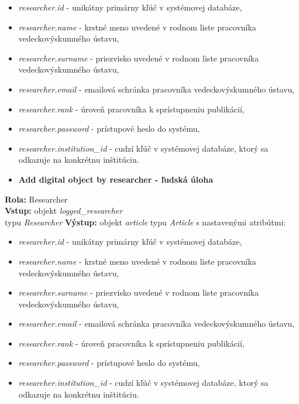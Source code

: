 \documentclass[10pt,oneside,slovak,a4paper]{article}
\begin{document}
\begin{itemize}
\item \textit{researcher.id} - unikátny primárny kľúč v systémovej databáze,
\item \textit{researcher.name} - krstné meno uvedené v rodnom liste pracovníka vedeckovýskumného ústavu,
\item \textit{researcher.surname} -  priezvisko uvedené v rodnom liste pracovníka vedeckovýskumného ústavu,
\item \textit{researcher.email} - emailová schránka pracovníka vedeckovýskumného ústavu,
\item \textit{researcher.rank} - úroveň pracovníka k sprístupneniu publikácií,
\item \textit{researcher.password} - prístupové heslo do systému,
\item \textit{researcher.institution\_id} - cudzí kľúč v systémovej databáze, ktorý sa odkazuje na konkrétnu inštitúciu.
\end{itemize}

\begin{itemize}
\item \textbf{Add digital object by researcher - ľudská úloha}
\end{itemize}

\textbf{Rola:} Researcher\\
\textbf{Vstup:} objekt \textit{logged\_researcher}\\ typu \textit{Researcher}
\textbf{Výstup:} objekt \textit{article} typu \textit{Article} s nastavenými atribútmi:

\begin{itemize}
\item \textit{researcher.id} - unikátny primárny kľúč v systémovej databáze,
\item \textit{researcher.name} - krstné meno uvedené v rodnom liste pracovníka vedeckovýskumného ústavu,
\item \textit{researcher.surname} -  priezvisko uvedené v rodnom liste pracovníka vedeckovýskumného ústavu,
\item \textit{researcher.email} - emailová schránka pracovníka vedeckovýskumného ústavu,
\item \textit{researcher.rank} - úroveň pracovníka k sprístupneniu publikácií,
\item \textit{researcher.password} - prístupové heslo do systému,
\item \textit{researcher.institution\_id} - cudzí kľúč v systémovej databáze, ktorý sa odkazuje na konkrétnu inštitúciu.
\end{itemize}
\end{document}
